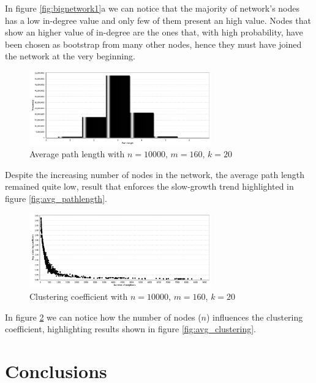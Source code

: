 \documentclass[12pt]{article}
\begin{document}
\noindent
In figure \ref{fig:bignetwork1}a we can notice that the majority of network's nodes has a low in-degree value and only few of them present an high value. Nodes that show an higher value of in-degree are the ones that, with high probability, have been chosen as bootstrap from many other nodes, hence they must have joined the network at the very beginning.

\begin{figure}[H]
    \centering
    \includegraphics[width=0.7\textwidth]{assets/avg_pathlength_n10000_m160_k20.png}
    \caption{Average path length with $n=10000$, $m=160$, $k=20$}
    \label{fig:bignetwork_pathlength}
\end{figure}

\noindent
Despite the increasing number of nodes in the network, the average path length remained quite low, result that enforces the slow-growth trend highlighted in figure \ref{fig:avg_pathlength}.

\begin{figure}[H]
    \centering
    \includegraphics[width=0.7\textwidth]{assets/cc_n10000_m160_k20.png}
    \caption{Clustering coefficient with $n=10000$, $m=160$, $k=20$}
    \label{fig:bignetwork_cc}
\end{figure}

\noindent
In figure \ref{fig:bignetwork_cc} we can notice how the number of nodes ($n$) influences the clustering coefficient, highlighting results shown in figure \ref{fig:avg_clustering}.

\pagebreak

\section{Conclusions}
\end{document}
